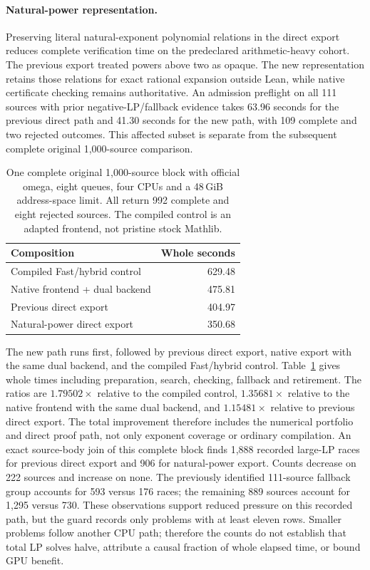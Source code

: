 \documentclass[10pt,twocolumn]{article}
\begin{document}
\paragraph{Natural-power representation.}
Preserving literal natural-exponent polynomial relations in the direct export
reduces complete verification time on the predeclared arithmetic-heavy cohort.
The previous export treated powers above two as opaque. The new representation retains those relations for exact rational expansion outside Lean, while native certificate checking
remains authoritative.
An admission preflight on all 111 sources with prior negative-LP/fallback
evidence takes 63.96 seconds for the previous direct path and 41.30 seconds for
the new path, with 109 complete and two rejected outcomes. This affected subset
is separate from the subsequent complete original 1,000-source comparison.

\begin{table}[t]
\centering
\small
\begin{tabular}{lr}
\toprule
Composition & Whole seconds \\
\midrule
Compiled Fast/hybrid control &629.48\\
Native frontend + dual backend &475.81\\
Previous direct export &404.97\\
Natural-power direct export &350.68\\
\bottomrule
\end{tabular}
\caption{One complete original 1,000-source block with official omega,
eight queues, four CPUs and a 48\,GiB address-space limit. All return
992 complete and eight rejected sources. The compiled control is an adapted
frontend, not pristine stock Mathlib.}
\label{tab:power-export}
\end{table}

The new path runs first, followed by previous direct export, native export
with the same dual backend, and the compiled Fast/hybrid control.
Table~\ref{tab:power-export} gives whole times including preparation,
search, checking, fallback and retirement.
The ratios are $1.79502\times$ relative to the compiled control,
$1.35681\times$ relative to the native frontend with the same dual backend,
and $1.15481\times$ relative to previous direct export. The total improvement
therefore includes the numerical portfolio and direct proof path, not only
exponent coverage or ordinary compilation.
An exact source-body join of this complete block finds 1,888 recorded
large-LP races for previous direct export and 906 for natural-power export.
Counts decrease on 222 sources and increase on none. The previously
identified 111-source fallback group accounts for 593 versus 176 races;
the remaining 889 sources account for 1,295 versus 730. These observations
support reduced pressure on this recorded path, but the guard records only
problems with at least eleven rows. Smaller problems follow another CPU path;
therefore the counts do not establish that total LP solves halve, attribute
a causal fraction of whole elapsed time, or bound GPU benefit.
\end{document}
